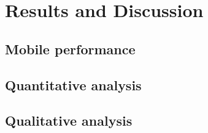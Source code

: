 \chapter{Results and Discussion}
\section{Mobile performance}
\section{Quantitative analysis}
\section{Qualitative analysis}